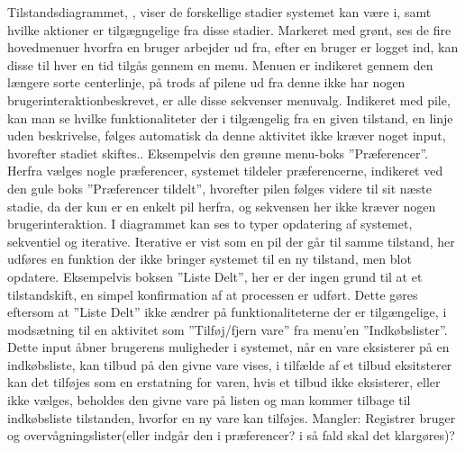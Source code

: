 Tilstandsdiagrammet, \myref{}, viser de forskellige stadier systemet kan være i, samt hvilke aktioner er tilgægngelige fra disse stadier.
Markeret med grønt, ses de fire hovedmenuer hvorfra en bruger arbejder ud fra, efter en bruger er logget ind, kan disse til hver en tid tilgås gennem en menu.
Menuen er indikeret gennem den længere sorte centerlinje, på trods af pilene ud fra denne ikke har nogen brugerinteraktionbeskrevet, er alle disse sekvenser menuvalg.
Indikeret med pile, kan man se hvilke funktionaliteter der i tilgængelig fra en given tilstand, en linje uden beskrivelse, følges automatisk da denne aktivitet ikke kræver noget input, hvorefter stadiet skiftes..
Eksempelvis den grønne menu-boks ''Præferencer''.
Herfra vælges nogle præferencer, systemet tildeler præferencerne, indikeret ved den gule boks ''Præferencer tildelt'', hvorefter pilen følges videre til sit næste stadie, da der kun er en enkelt pil herfra, og sekvensen her ikke kræver nogen brugerinteraktion.
I diagrammet kan ses to typer opdatering af systemet, sekventiel og iterative.
Iterative er vist som en pil der går til samme tilstand, her udføres en funktion der ikke bringer systemet til en ny tilstand, men blot opdatere.
Eksempelvis boksen ''Liste Delt'', her er der ingen grund til at et tilstandskift, en simpel konfirmation af at processen er udført.
Dette gøres eftersom at ''Liste Delt'' ikke ændrer på funktionaliteterne der er tilgængelige, i modsætning til en aktivitet som ''Tilføj/fjern vare'' fra menu'en ''Indkøbslister''.
Dette input åbner brugerens muligheder i systemet, når en vare eksisterer på en indkøbsliste, kan tilbud på den givne vare vises, i tilfælde af et tilbud eksitsterer kan det tilføjes som en erstatning for varen, hvis et tilbud ikke eksisterer, eller ikke vælges, beholdes den givne vare på listen og man kommer tilbage til indkøbsliste tilstanden, hvorfor en ny vare kan tilføjes.
Mangler: Registrer bruger og overvågningslister(eller indgår den i præferencer? i så fald skal det klargøres)?